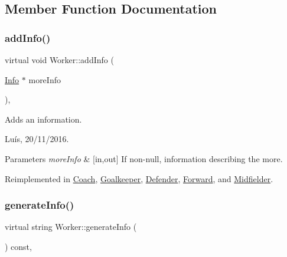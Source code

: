 \subsection{Member Function Documentation}
\hypertarget{class_worker_ad54db262f7473cc729c371dd54e292eb}{}\label{class_worker_ad54db262f7473cc729c371dd54e292eb} 
\subsubsection{\texorpdfstring{add\+Info()}{addInfo()}}
{\footnotesize\ttfamily virtual void Worker\+::add\+Info (\begin{DoxyParamCaption}\item[{\hyperlink{class_info}{Info} $\ast$}]{more\+Info }\end{DoxyParamCaption})\hspace{0.3cm}{\ttfamily [inline]}, {\ttfamily [virtual]}}



Adds an information. 

Luís, 20/11/2016. 


\begin{DoxyParams}{Parameters}
{\em more\+Info} & \mbox{[}in,out\mbox{]} If non-\/null, information describing the more. \\
\hline
\end{DoxyParams}


Reimplemented in \hyperlink{class_coach_a989f8c8ec5ba95849503f79376fc68bb}{Coach}, \hyperlink{class_goalkeeper_a97fc43118c67d500d7d56abc9c0029fe}{Goalkeeper}, \hyperlink{class_defender_abcd887808491719d6e40d92d68862b4e}{Defender}, \hyperlink{class_forward_a18f2db8a8234912d6a27727cb3b04fd9}{Forward}, and \hyperlink{class_midfielder_aca69e728b57110b3f34de94556465c0a}{Midfielder}.

\hypertarget{class_worker_ac77905603b86c58cb0a87d6389dca744}{}\label{class_worker_ac77905603b86c58cb0a87d6389dca744} 
\subsubsection{\texorpdfstring{generate\+Info()}{generateInfo()}}
{\footnotesize\ttfamily virtual string Worker\+::generate\+Info (\begin{DoxyParamCaption}{ }\end{DoxyParamCaption}) const\hspace{0.3cm}{\ttfamily [inline]}, {\ttfamily [virtual]}}



